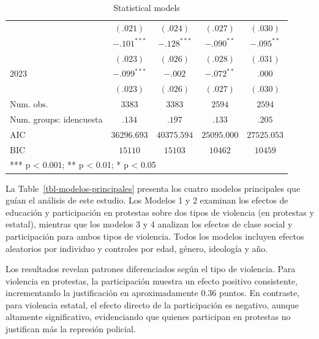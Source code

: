 \documentclass[
  13pt,
]{article}
\begin{document}
\begin{table}
{\begin{center}
{\begin{tabular}{l c c c c}
                                         & $(.021)$      & $(.024)$      & $(.027)$      & $(.030)$      \\
\quad 2022                               & $-.101^{***}$ & $-.128^{***}$ & $-.090^{**}$  & $-.095^{**}$  \\
                                         & $(.023)$      & $(.026)$      & $(.028)$      & $(.031)$      \\
2023                                     & $-.099^{***}$ & $-.002$       & $-.072^{**}$  & $.000$        \\
                                         & $(.023)$      & $(.026)$      & $(.027)$      & $(.030)$      \\
\midrule
Num. obs.                                & $3383$        & $3383$        & $2594$        & $2594$        \\
Num. groups: idencuesta                  & $.134$        & $.197$        & $.133$        & $.205$        \\
AIC                                      & $36296.693$   & $40375.594$   & $25095.000$   & $27525.053$   \\
BIC                                      & $15110$       & $15103$       & $10462$       & $10459$       \\
\bottomrule
\multicolumn{5}{l}{\scriptsize{*** p < 0.001; ** p < 0.01; * p < 0.05}}
\end{tabular}
}
\caption{Statistical models}
\label{}
\end{center}

}

\end{table}%

La Table~\ref{tbl-modelos-principales} presenta los cuatro modelos
principales que guían el análisis de este estudio. Los Modelos 1 y 2
examinan los efectos de educación y participación en protestas sobre dos
tipos de violencia (en protestas y estatal), mientras que los modelos 3
y 4 analizan los efectos de clase social y participación para ambos
tipos de violencia. Todos los modelos incluyen efectos aleatorios por
individuo y controles por edad, género, ideología y año.

Los resultados revelan patrones diferenciados según el tipo de
violencia. Para violencia en protestas, la participación muestra un
efecto positivo consistente, incrementando la justificación en
aproximadamente 0.36 puntos. En contraste, para violencia estatal, el
efecto directo de la participación es negativo, aunque altamente
significativo, evidenciando que quienes participan en protestas no
justifican más la represión policial.
\end{document}
